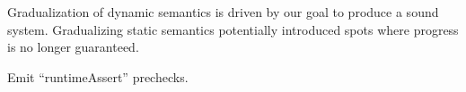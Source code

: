 Gradualization of dynamic semantics is driven by our goal to produce a sound system.
Gradualizing static semantics potentially introduced spots where progress is no longer guaranteed.

Emit “runtimeAssert” prechecks.

